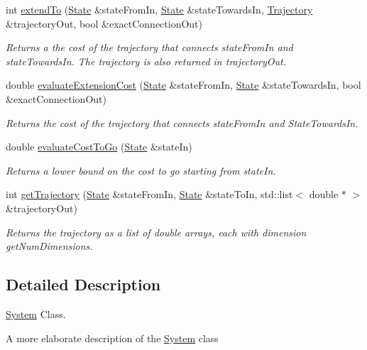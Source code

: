 \begin{DoxyCompactItemize}
int \hyperlink{class_system_ae6e8fe1ab14336405695ff03e09280cd}{extend\-To} (\hyperlink{class_state}{State} \&state\-From\-In, \hyperlink{class_state}{State} \&state\-Towards\-In, \hyperlink{class_trajectory}{Trajectory} \&trajectory\-Out, bool \&exact\-Connection\-Out)
\begin{DoxyCompactList}\small\item\em Returns a the cost of the trajectory that connects state\-From\-In and state\-Towards\-In. The trajectory is also returned in trajectory\-Out. \end{DoxyCompactList}\item 
double \hyperlink{class_system_a54c10d1e2bd5da67907f462a4ee80520}{evaluate\-Extension\-Cost} (\hyperlink{class_state}{State} \&state\-From\-In, \hyperlink{class_state}{State} \&state\-Towards\-In, bool \&exact\-Connection\-Out)
\begin{DoxyCompactList}\small\item\em Returns the cost of the trajectory that connects state\-From\-In and State\-Towards\-In. \end{DoxyCompactList}\item 
double \hyperlink{class_system_a59f6ec06d751bd3379b093a1abc7d0e1}{evaluate\-Cost\-To\-Go} (\hyperlink{class_state}{State} \&state\-In)
\begin{DoxyCompactList}\small\item\em Returns a lower bound on the cost to go starting from state\-In. \end{DoxyCompactList}\item 
int \hyperlink{class_system_ac692c12db3dae5ecde2889433157029c}{get\-Trajectory} (\hyperlink{class_state}{State} \&state\-From\-In, \hyperlink{class_state}{State} \&state\-To\-In, std\-::list$<$ double $\ast$ $>$ \&trajectory\-Out)
\begin{DoxyCompactList}\small\item\em Returns the trajectory as a list of double arrays, each with dimension get\-Num\-Dimensions. \end{DoxyCompactList}\end{DoxyCompactItemize}


\subsection{Detailed Description}
\hyperlink{class_system}{System} Class. 

A more elaborate description of the \hyperlink{class_system}{System} class 

